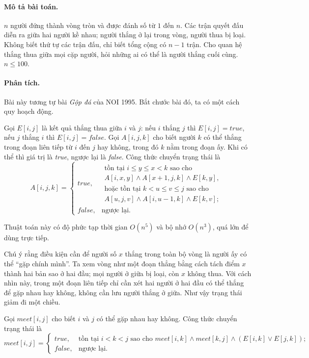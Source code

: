 \documentclass[11pt]{article}
\begin{document}
\paragraph{Mô tả bài toán.}
$n$ người đứng thành vòng tròn và được đánh số từ $1$ đến $n$. Các trận quyết
đấu diễn ra giữa hai người kề nhau; người thắng ở lại trong vòng, người thua
bị loại. Không biết thứ tự các trận đấu, chỉ biết tổng cộng có $n-1$ trận.
Cho quan hệ thắng thua giữa mọi cặp người, hỏi những ai có thể là người thắng
cuối cùng. $n\le 100$.

\paragraph{Phân tích.}
Bài này tương tự bài \emph{Gộp đá} của NOI 1995. Bắt chước bài đó, ta có một
cách quy hoạch động.

Gọi $E[i,j]$ là kết quả thắng thua giữa $i$ và $j$: nếu $i$ thắng $j$ thì
$E[i,j]=\mathit{true}$, nếu $j$ thắng $i$ thì $E[i,j]=\mathit{false}$.
Gọi $A[i,j,k]$ cho biết người $k$ có thể thắng trong đoạn liên tiếp từ $i$
đến $j$ hay không, trong đó $k$ nằm trong đoạn ấy. Khi có thể thì giá trị là
\textit{true}, ngược lại là \textit{false}. Công thức chuyển trạng thái là
\[
A[i,j,k]=
\begin{cases}
\mathit{true}, & \begin{array}{l}
\text{tồn tại } i\le y\le x<k \text{ sao cho}\\
A[i,x,y]\land A[x+1,j,k]\land E[k,y],\\
\text{hoặc tồn tại } k<u\le v\le j \text{ sao cho}\\
A[u,j,v]\land A[i,u-1,k]\land E[k,v];
\end{array}\\
\mathit{false}, & \text{ngược lại.}
\end{cases}
\]

Thuật toán này có độ phức tạp thời gian $O(n^5)$ và bộ nhớ $O(n^3)$, quá lớn
để dùng trực tiếp.

Chú ý rằng điều kiện cần để người số $x$ thắng trong toàn bộ vòng là người ấy
có thể ``gặp chính mình''. Ta xem vòng như một đoạn thẳng bằng cách tách điểm
$x$ thành hai bản sao ở hai đầu; mọi người ở giữa bị loại, còn $x$ không thua.
Với cách nhìn này, trong một đoạn liên tiếp chỉ cần xét hai người ở hai đầu
có thể thắng để gặp nhau hay không, không cần lưu người thắng ở giữa. Như vậy
trạng thái giảm đi một chiều.

Gọi $\mathit{meet}[i,j]$ cho biết $i$ và $j$ có thể gặp nhau hay không. Công
thức chuyển trạng thái là
\[
\mathit{meet}[i,j]=
\begin{cases}
\mathit{true}, &
\text{tồn tại } i<k<j \text{ sao cho }
\mathit{meet}[i,k]\land \mathit{meet}[k,j]\land (E[i,k]\lor E[j,k]);\\
\mathit{false}, & \text{ngược lại.}
\end{cases}
\]
\end{document}
